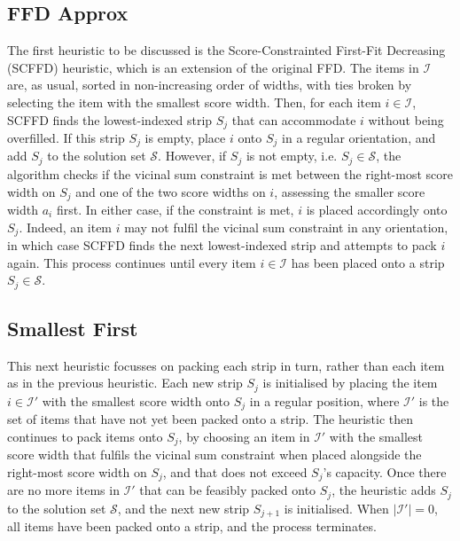 \documentclass[oribibl]{llncs}
\begin{document}
\subsection{FFD Approx}
\label{sec:ffdapprox}
The first heuristic to be discussed is the Score-Constrainted First-Fit Decreasing (SCFFD) heuristic, which is an extension of the original FFD. The items in $\mathcal{I}$ are, as usual, sorted in non-increasing order of widths, with ties broken by selecting the item with the smallest score width. Then, for each item $i \in \mathcal{I}$, SCFFD finds the lowest-indexed strip $S_j$ that can accommodate $i$ without being overfilled. If this strip $S_j$ is empty, place $i$ onto $S_j$ in a regular orientation, and add $S_j$ to the solution set $\mathcal{S}$. However, if $S_j$ is not empty, i.e. $S_j \in \mathcal{S}$, the algorithm checks if the vicinal sum constraint is met between the right-most score width on $S_j$ and one of the two score widths on $i$, assessing the smaller score width $a_i$ first. In either case, if the constraint is met, $i$ is placed accordingly onto $S_j$. Indeed, an item $i$ may not fulfil the vicinal sum constraint in any orientation, in which case SCFFD finds the next lowest-indexed strip and attempts to pack $i$ again. This process continues until every item $i \in \mathcal{I}$ has been placed onto a strip $S_j \in \mathcal{S}$.

\subsection{Smallest First}
\label{sec:ffdsmall}
This next heuristic focusses on packing each strip in turn, rather than each item as in the previous heuristic. Each new strip $S_j$ is initialised by placing the item $i \in \mathcal{I}'$ with the smallest score width onto $S_j$ in a regular position, where $\mathcal{I}'$ is the set of items that have not yet been packed onto a strip. The heuristic then continues to pack items onto $S_j$, by choosing an item in $\mathcal{I}'$ with the smallest score width that fulfils the vicinal sum constraint when placed alongside the right-most score width on $S_j$, and that does not exceed $S_j$'s capacity. Once there are no more items in $\mathcal{I}'$ that can be feasibly packed onto $S_j$, the heuristic adds $S_j$ to the solution set $\mathcal{S}$, and the next new strip $S_{j+1}$ is initialised. When $|\mathcal{I}'| = 0$, all items have been packed onto a strip, and the process terminates.
\end{document}
